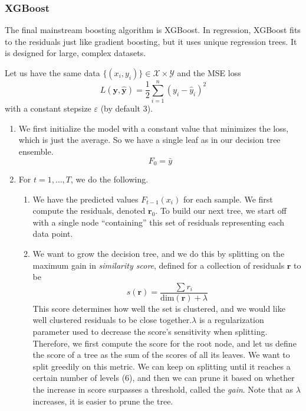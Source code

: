       \subsubsection{XGBoost} 

        The final mainstream boosting algorithm is XGBoost. In regression, XGBoost fits to the residuals just like gradient boosting, but it uses unique regression trees. It is designed for large, complex datasets. 

        \begin{definition} 
          Let us have the same data $\{(x_i, y_i)\} \in \mathcal{X} \times \mathcal{Y}$ and the MSE loss 
          \begin{equation}
            L(\mathbf{y}, \hat{\mathbf{y}}) = \frac{1}{2} \sum_{i=1}^n (y_i - \hat{y}_i)^2
          \end{equation}
          with a constant stepsize $\varepsilon$ (by default $3$). 

          \begin{enumerate}
            \item We first initialize the model with a constant value that minimizes the loss, which is just the average. So we have a single leaf as in our decision tree ensemble. 
              \begin{equation}
                F_0 = \bar{y}
              \end{equation}

            \item For $t = 1, \ldots, T$, we do the following. 
              \begin{enumerate}
                \item We have the predicted values $F_{t-1}(x_i)$ for each sample. We first compute the residuals, denoted $\mathbf{r}_0$. To build our next tree, we start off with a single node ``containing'' this set of residuals representing each data point. 

                \item We want to grow the decision tree, and we do this by splitting on the maximum gain in \textit{similarity score}, defined for a collection of residuals $\mathbf{r}$ to be 
                \begin{equation}
                  s(\mathbf{r}) = \frac{\sum r_i}{\mathrm{dim}(\mathbf{r}) + \lambda}
                \end{equation}
                This score determines how well the set is clustered, and we would like well clustered residuals to be close together.$\lambda$ is a regularization parameter used to decrease the score's sensitivity when splitting. Therefore, we first compute the score for the root node, and let us define the score of a tree as the sum of the scores of all its leaves. We want to split greedily on this metric. We can keep on splitting until it reaches a certain number of levels (6), and then we can prune it based on whether the increase in score surpasses a threshold, called the \textit{gain}. Note that as $\lambda$ increases, it is easier to prune the tree. 


\end{enumerate}
\end{enumerate}
\end{definition}
